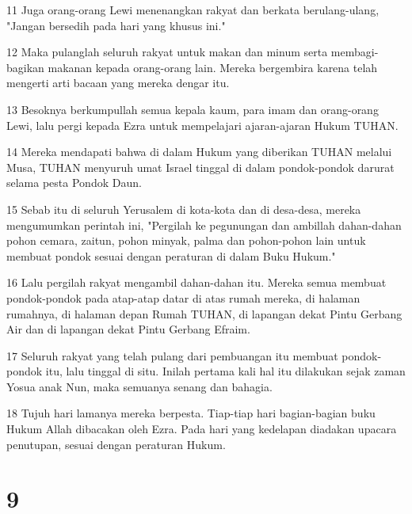 \par 11 Juga orang-orang Lewi menenangkan rakyat dan berkata berulang-ulang, "Jangan bersedih pada hari yang khusus ini."
\par 12 Maka pulanglah seluruh rakyat untuk makan dan minum serta membagi-bagikan makanan kepada orang-orang lain. Mereka bergembira karena telah mengerti arti bacaan yang mereka dengar itu.
\par 13 Besoknya berkumpullah semua kepala kaum, para imam dan orang-orang Lewi, lalu pergi kepada Ezra untuk mempelajari ajaran-ajaran Hukum TUHAN.
\par 14 Mereka mendapati bahwa di dalam Hukum yang diberikan TUHAN melalui Musa, TUHAN menyuruh umat Israel tinggal di dalam pondok-pondok darurat selama pesta Pondok Daun.
\par 15 Sebab itu di seluruh Yerusalem di kota-kota dan di desa-desa, mereka mengumumkan perintah ini, "Pergilah ke pegunungan dan ambillah dahan-dahan pohon cemara, zaitun, pohon minyak, palma dan pohon-pohon lain untuk membuat pondok sesuai dengan peraturan di dalam Buku Hukum."
\par 16 Lalu pergilah rakyat mengambil dahan-dahan itu. Mereka semua membuat pondok-pondok pada atap-atap datar di atas rumah mereka, di halaman rumahnya, di halaman depan Rumah TUHAN, di lapangan dekat Pintu Gerbang Air dan di lapangan dekat Pintu Gerbang Efraim.
\par 17 Seluruh rakyat yang telah pulang dari pembuangan itu membuat pondok-pondok itu, lalu tinggal di situ. Inilah pertama kali hal itu dilakukan sejak zaman Yosua anak Nun, maka semuanya senang dan bahagia.
\par 18 Tujuh hari lamanya mereka berpesta. Tiap-tiap hari bagian-bagian buku Hukum Allah dibacakan oleh Ezra. Pada hari yang kedelapan diadakan upacara penutupan, sesuai dengan peraturan Hukum.

\chapter{9}


